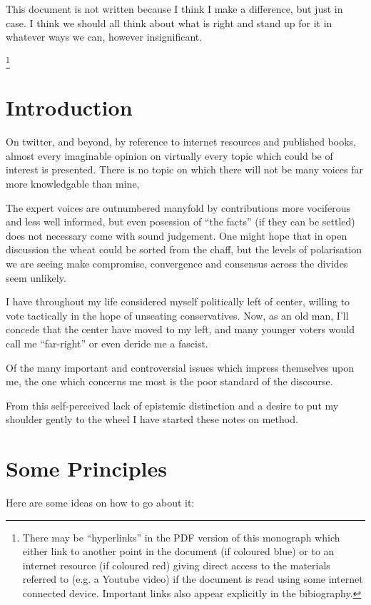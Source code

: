 \documentclass[10pt,titlepage]{article}
\begin{document}
This document is not written because I think I make a difference, but just in case.
I think we should all think about what is right and stand up for it in whatever ways we can, however insignificant.

\footnote{There may be ``hyperlinks'' in the PDF version of this monograph which either link to another point in the document  (if coloured blue) or to an internet resource  (if coloured red) giving direct access to the materials referred to (e.g. a Youtube video) if the document is read using some internet connected device.
Important links also appear explicitly in the bibiography.}

\section{Introduction}

On twitter, and beyond, by reference to internet resources and published books, almost every imaginable opinion on virtually every topic which could be of interest is presented.
There is no topic on which there will not be many voices far more knowledgable than mine,

The expert voices are outnumbered manyfold by contributions more vociferous and less well informed, but even posession of ``the facts'' (if they can be settled) does not necessary come with sound judgement.
One might hope that in open discussion the wheat could be sorted from the chaff, but the levels of polarisation we are seeing make compromise, convergence and consensus across the divides seem unlikely.

I  have throughout my life considered myself politically left of center, willing to vote tactically in the hope of unseating conservatives.
Now, as an old man, I'll concede that the center have moved to my left, and many younger voters would call me ``far-right'' or even deride me a fascist.

Of the many important and controversial issues which impress themselves upon me, the one which concerns me most is the poor standard of the discourse.

From this self-perceived lack of epistemic distinction and a desire to put my shoulder gently to the wheel I have started these notes on method.


\section{Some Principles}

Here are some ideas on how to go about it:
\end{document}
